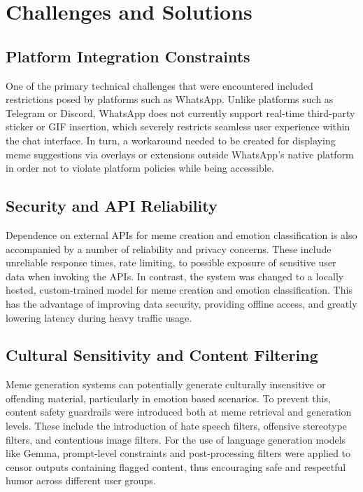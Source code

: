 \documentclass[conference]{IEEEtran}
\begin{document}
%

\section{Challenges and Solutions}
\subsection{Platform Integration Constraints}
One of the primary technical challenges that were encountered included restrictions posed by platforms such as WhatsApp. Unlike platforms such as Telegram or Discord, WhatsApp does not currently support real-time third-party sticker or GIF insertion, which severely restricts seamless user experience within the chat interface. In turn, a workaround needed to be created for displaying meme suggestions via overlays or extensions outside WhatsApp’s native platform in order not to violate platform policies while being accessible.

\subsection{Security and API Reliability}
Dependence on external APIs for meme creation and emotion classification is also accompanied by a number of reliability and privacy concerns. These include unreliable response times, rate limiting, to possible exposure of sensitive user data when invoking the APIs. In contrast, the system was changed to a locally hosted, custom-trained model for meme creation and emotion classification. This has the advantage of improving data security, providing offline access, and greatly lowering latency during heavy traffic usage.

\subsection{Cultural Sensitivity and Content Filtering}
Meme generation systems can potentially generate culturally insensitive or offending material, particularly in emotion based scenarios. To prevent this, content safety guardrails
were introduced both at meme retrieval and generation levels. These include the introduction of hate speech filters, offensive stereotype filters, and contentious image filters. For the use of language generation models like Gemma, prompt-level constraints and post-processing filters were applied to censor outputs containing flagged content, thus encouraging safe and respectful humor across different user groups.
\end{document}
